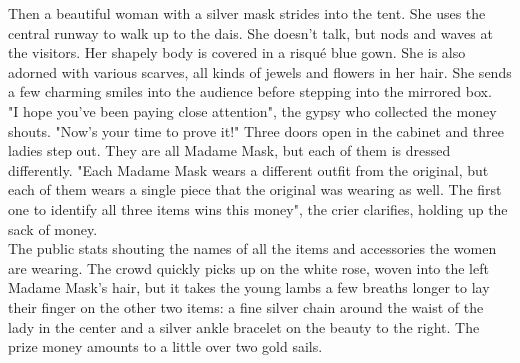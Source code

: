 Then a beautiful woman with a silver mask strides into the tent. She uses the central runway to walk up to the dais. She doesn't talk, but nods and waves at the visitors. Her shapely body is covered in a risqu\'e blue gown. She is also adorned with various scarves, all kinds of jewels and flowers in her hair. She sends a few charming smiles into the audience before stepping into the mirrored box.\\

"I hope you've been paying close attention", the gypsy who collected the money shouts. "Now's your time to prove it!" Three doors open in the cabinet and three ladies step out. They are all Madame Mask, but each of them is dressed differently. "Each Madame Mask wears a different outfit from the original, but each of them wears a single piece that the original was wearing as well. The first one to identify all three items wins this money", the crier clarifies, holding up the sack of money.\\

The public stats shouting the names of all the items and accessories the women are wearing. The crowd quickly picks up on the white rose, woven into the left Madame Mask's hair, but it takes the young lambs a few breaths longer to lay their finger on the other two items: a fine silver chain around the waist of the lady in the center and a silver ankle bracelet on the beauty to the right. The prize money amounts to a little over two gold sails.\\

